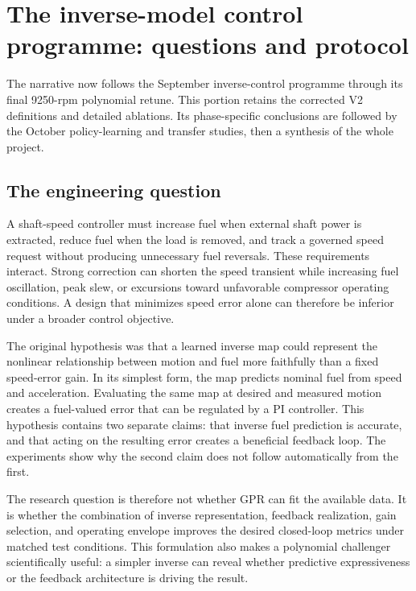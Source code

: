 \chapter{The inverse-model control programme: questions and protocol}
The narrative now follows the September inverse-control programme through its final 9250-rpm polynomial retune. This portion retains the corrected V2 definitions and detailed ablations. Its phase-specific conclusions are followed by the October policy-learning and transfer studies, then a synthesis of the whole project.

\section{The engineering question}
A shaft-speed controller must increase fuel when external shaft power is extracted, reduce fuel when the load is removed, and track a governed speed request without producing unnecessary fuel reversals. These requirements interact. Strong correction can shorten the speed transient while increasing fuel oscillation, peak slew, or excursions toward unfavorable compressor operating conditions. A design that minimizes speed error alone can therefore be inferior under a broader control objective.

The original hypothesis was that a learned inverse map could represent the nonlinear relationship between motion and fuel more faithfully than a fixed speed-error gain. In its simplest form, the map predicts nominal fuel from speed and acceleration. Evaluating the same map at desired and measured motion creates a fuel-valued error that can be regulated by a PI controller. This hypothesis contains two separate claims: that inverse fuel prediction is accurate, and that acting on the resulting error creates a beneficial feedback loop. The experiments show why the second claim does not follow automatically from the first.

The research question is therefore not whether GPR can fit the available data. It is whether the combination of inverse representation, feedback realization, gain selection, and operating envelope improves the desired closed-loop metrics under matched test conditions. This formulation also makes a polynomial challenger scientifically useful: a simpler inverse can reveal whether predictive expressiveness or the feedback architecture is driving the result.

